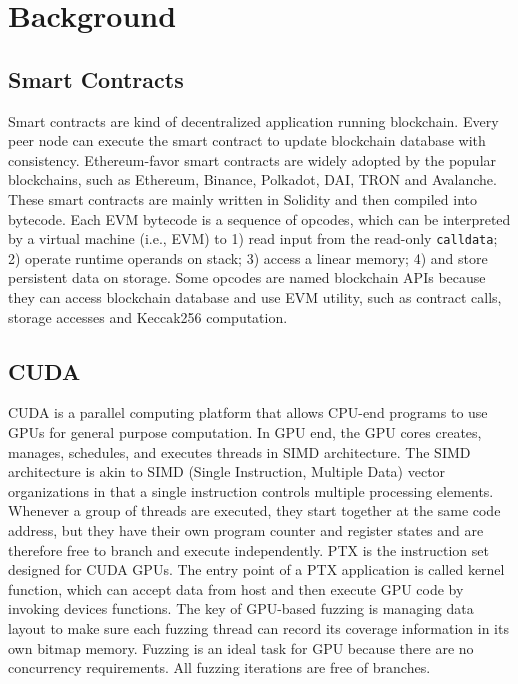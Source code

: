 \section{Background}

\subsection{Smart Contracts}
Smart contracts are kind of decentralized application running blockchain. 
Every peer node can execute the smart contract to update blockchain database with consistency. 
Ethereum-favor smart contracts are widely adopted by the popular blockchains, such as Ethereum\cite{wood2014ethereum}, Binance\cite{binance2021whitepaper}, Polkadot\cite{polkadot2021whitepaper}, DAI\cite{dai2021paper}, TRON\cite{tron2021paper} and Avalanche\cite{avalab2021paper}.
These smart contracts are mainly written in Solidity\cite{solidity} and then compiled into bytecode.
Each EVM bytecode is a sequence of opcodes, which can be interpreted by a virtual machine (i.e., EVM) to 1) read input from the read-only \texttt{calldata}; 2) operate runtime operands on stack; 3) access a linear memory; 4) and store persistent data on storage.
Some opcodes are named blockchain APIs because they can access blockchain database and use EVM utility, such as contract calls, storage accesses and Keccak256 computation\cite{bertoni2013keccak}. 

\subsection{CUDA}
CUDA\cite{nvidia2021cuda} is a parallel computing platform that allows CPU-end programs to use GPUs for general purpose computation. 
In GPU end, the GPU cores creates, manages, schedules, and executes threads in SIMD architecture.
The SIMD architecture is akin to SIMD (Single Instruction, Multiple Data) vector organizations in that a single instruction controls multiple processing elements.
Whenever a group of threads are executed, they start together at the same code address, but they have their own program counter and register states and are therefore free to branch and execute independently.
PTX is the instruction set designed for CUDA GPUs.
The entry point of a PTX application is called kernel function, which can accept data from host and then execute GPU code by invoking devices functions. 
%
The key of GPU-based fuzzing is managing data layout to make sure each fuzzing thread can record its coverage information in its own bitmap memory.   
Fuzzing is an ideal task for GPU because there are no concurrency requirements. All fuzzing iterations are free of branches.